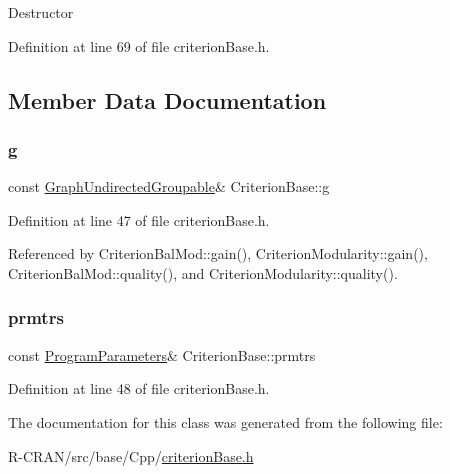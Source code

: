 Destructor 

Definition at line 69 of file criterion\+Base.\+h.



\subsection{Member Data Documentation}
\mbox{\label{classCriterionBase_a610fe9f207de420117ad25550c185f97}} 
\subsubsection{\texorpdfstring{g}{g}}
{\footnotesize\ttfamily const \hyperlink{classGraphUndirectedGroupable}{Graph\+Undirected\+Groupable}\& Criterion\+Base\+::g\hspace{0.3cm}{\ttfamily [protected]}}



Definition at line 47 of file criterion\+Base.\+h.



Referenced by Criterion\+Bal\+Mod\+::gain(), Criterion\+Modularity\+::gain(), Criterion\+Bal\+Mod\+::quality(), and Criterion\+Modularity\+::quality().

\mbox{\label{classCriterionBase_a4253d177fc6e27cf675d541b116a1534}} 
\subsubsection{\texorpdfstring{prmtrs}{prmtrs}}
{\footnotesize\ttfamily const \hyperlink{structProgramParameters}{Program\+Parameters}\& Criterion\+Base\+::prmtrs\hspace{0.3cm}{\ttfamily [protected]}}



Definition at line 48 of file criterion\+Base.\+h.



The documentation for this class was generated from the following file\+:\begin{DoxyCompactItemize}
\item 
R-\/\+C\+R\+A\+N/src/base/\+Cpp/\hyperlink{criterionBase_8h}{criterion\+Base.\+h}\end{DoxyCompactItemize}
